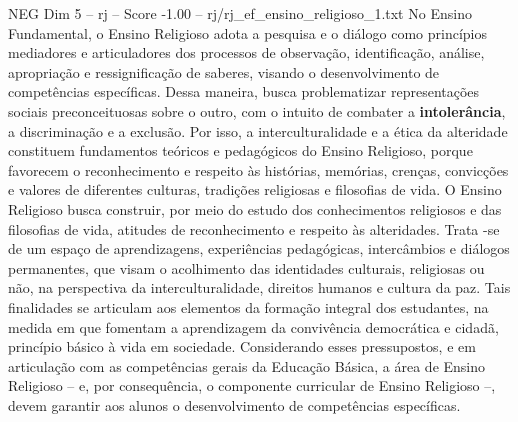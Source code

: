 \begin{textsample}{NEG Dim 5 – rj – Score -1.00 – rj/rj\_ef\_ensino\_religioso\_1.txt}
No Ensino Fundamental, o Ensino Religioso adota a pesquisa e o diálogo como princípios mediadores e articuladores dos processos de observação, identificação, análise, apropriação e ressignificação de saberes, visando o desenvolvimento de competências específicas.
Dessa maneira, busca problematizar representações sociais preconceituosas sobre o outro, com o intuito de combater a \textbf{intolerância}, a discriminação e a exclusão.
Por isso, a interculturalidade e a ética da alteridade constituem fundamentos teóricos e pedagógicos do Ensino Religioso, porque favorecem o reconhecimento e respeito às histórias, memórias, crenças, convicções e valores de diferentes culturas, tradições religiosas e filosofias de vida.
O Ensino Religioso busca construir, por meio do estudo dos conhecimentos religiosos e das filosofias de vida, atitudes de reconhecimento e respeito às alteridades.
Trata -se de um espaço de aprendizagens, experiências pedagógicas, intercâmbios e diálogos permanentes, que visam o acolhimento das identidades culturais, religiosas ou não, na perspectiva da interculturalidade, direitos humanos e cultura da paz.
Tais finalidades se articulam aos elementos da formação integral dos estudantes, na medida em que fomentam a aprendizagem da convivência democrática e cidadã, princípio básico à vida em sociedade.
Considerando esses pressupostos, e em articulação com as competências gerais da Educação Básica, a área de Ensino Religioso – e, por consequência, o componente curricular de Ensino Religioso –, devem garantir aos alunos o desenvolvimento de competências específicas.

\end{textsample}
